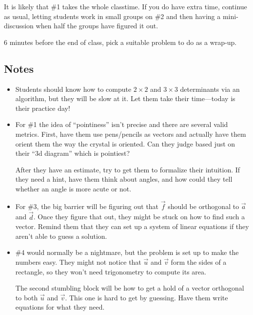 		It is likely that \#1 takes the whole classtime. If you do have extra time, continue as usual,
		letting students work in small groups on \#2 and then having a mini-discussion when half the groups
		have figured it out.

		6 minutes before the end of class, pick a suitable problem to do as a wrap-up.

\subsection*{Notes}
	\begin{itemize}
		\item Students should know how to compute $2\times 2$ and $3\times 3$ determinants via
			an algorithm, but they will be slow at it. Let them take their time---today is their practice day!
		\item For \#1 the idea of ``pointiness'' isn't precise and there are several valid metrics.
			First, have them use pens/pencils as vectors and actually have them orient them the way the crystal is oriented.
			Can they judge based just on their ``3d diagram'' which is pointiest?

			After they have an estimate, try to get them to formalize their intuition.
			If they need a hint, have them think about angles, and
			how could they tell whether an angle is more acute or not.

		\item For \#3, the big barrier will be figuring out that $\vec f$ should be orthogonal
			to $\vec a$ and $\vec d$. Once they figure that out, they might be stuck on how to find
			such a vector. Remind them that they can set up a system of linear equations if they
			aren't able to guess a solution.

		\item \#4 would normally be a nightmare, but the problem is set up to make the numbers easy.
			They might not notice that $\vec u$ and $\vec v$ form the sides of a rectangle, so
			they won't need trigonometry to compute its area.

			The second stumbling block will be how to get a hold of a vector orthogonal to both
			$\vec u$ and $\vec v$. This one is hard to get by guessing. Have them write equations
			for what they need.
	\end{itemize} 